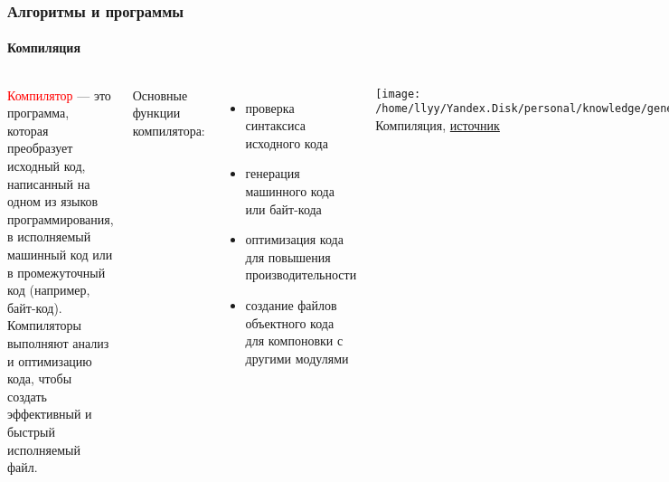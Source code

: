 \documentclass[aspectratio=169]{beamer}
\begin{document}
\begin{frame}
\frametitle{Алгоритмы и программы}
\framesubtitle{Компиляция}
\begin{block}{}
\begin{columns}[]
\column{\dimexpr\linewidth-40mm}
\justifying
\small
\textcolor{red}{Компилятор} — это программа, которая преобразует исходный код, написанный на одном из языков программирования, в исполняемый машинный код или в промежуточный код (например, байт-код).\newline\newline
Компиляторы выполняют анализ и оптимизацию кода, чтобы создать эффективный и быстрый исполняемый файл.\newline

Основные функции компилятора:
\begin{itemize}
\item{проверка синтаксиса исходного кода}
\item{генерация машинного кода или байт-кода}
\item{оптимизация кода для повышения производительности}
\item{создание файлов объектного кода для компоновки с другими модулями}
\end{itemize}

\column{40mm}

\texttt{[image: /home/llyy/Yandex.Disk/personal/knowledge/general/algorithms\_course/repo/algorithms\_course/0\_intro/images/compiler\_code\_stage]}
\centering
\tiny Компиляция, \href{https://ya.ru}{источник} 

\end{columns}
\end{block}
\end{frame}
\end{document}
